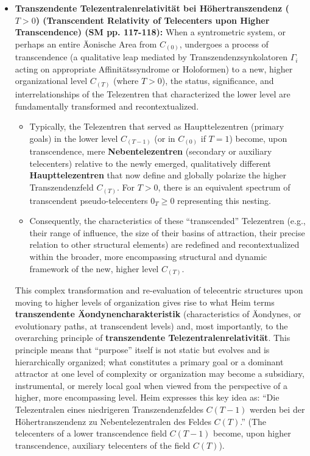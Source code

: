 \documentclass[12pt]{article}
\newcommand{\q}[1]{\enquote{#1}}
\begin{document}
\begin{itemize}
    \item \textbf{Transzendente Telezentralenrelativität bei Höhertranszendenz (\( T > 0 \)) (Transcendent Relativity of Telecenters upon Higher Transcendence) (SM pp. 117-118):}
    When a syntrometric system, or perhaps an entire Äonische Area from \( C_{(0)} \), undergoes a process of transcendence (a qualitative leap mediated by Transzendenzsynkolatoren \( \Gamma_i \) acting on appropriate Affinitätssyndrome or Holoformen) to a new, higher organizational level \( C_{(T)} \) (where \( T > 0 \)), the status, significance, and interrelationships of the Telezentren that characterized the lower level are fundamentally transformed and recontextualized. 
    \begin{itemize}
        \item Typically, the Telezentren that served as Haupttelezentren (primary goals) in the lower level \( C_{(T-1)} \) (or in \( C_{(0)} \) if \( T=1 \)) become, upon transcendence, mere \textbf{Nebentelezentren} (secondary or auxiliary telecenters) relative to the newly emerged, qualitatively different \textbf{Haupttelezentren} that now define and globally polarize the higher Transzendenzfeld \( C_{(T)} \). For \(T>0\), there is an equivalent spectrum of transcendent pseudo-telecenters \(0_T \ge 0\) representing this nesting.
        \item Consequently, the characteristics of these \q{transcended} Telezentren (e.g., their range of influence, the size of their basins of attraction, their precise relation to other structural elements) are redefined and recontextualized within the broader, more encompassing structural and dynamic framework of the new, higher level \( C_{(T)} \).
    \end{itemize}
    This complex transformation and re-evaluation of telecentric structures upon moving to higher levels of organization gives rise to what Heim terms \textbf{transzendente Äondynencharakteristik} (characteristics of Äondynes, or evolutionary paths, at transcendent levels) and, most importantly, to the overarching principle of \textbf{transzendente Telezentralenrelativität}. This principle means that \q{purpose} itself is not static but evolves and is hierarchically organized; what constitutes a primary goal or a dominant attractor at one level of complexity or organization may become a subsidiary, instrumental, or merely local goal when viewed from the perspective of a higher, more encompassing level. Heim expresses this key idea as: \q{Die Telezentralen eines niedrigeren Transzendenzfeldes \( C(T-1) \) werden bei der Höhertranszendenz zu Nebentelezentralen des Feldes \( C(T) \).} (The telecenters of a lower transcendence field \( C(T-1) \) become, upon higher transcendence, auxiliary telecenters of the field \( C(T) \)).


\end{itemize}
\end{document}
